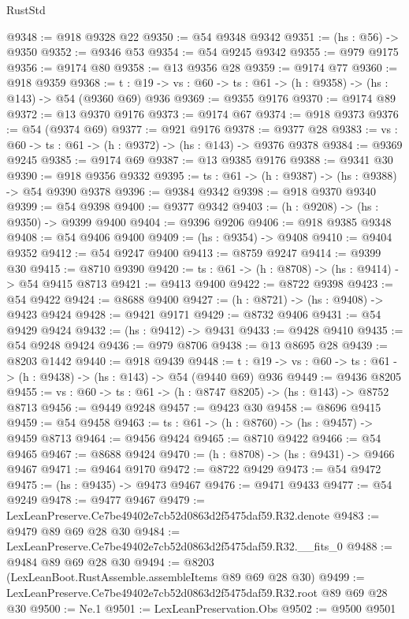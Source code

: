 \begin{lexlean}{RustStd}
\begin{coremodule}
@9348 := @918 @9328 @22
@9350 := @54 @9348 @9342
@9351 := (hs : @56) -> @9350
@9352 := @9346 @53
@9354 := @54 @9245 @9342
@9355 := @979 @9175
@9356 := @9174 @80
@9358 := @13 @9356 @28
@9359 := @9174 @77
@9360 := @918 @9359
@9368 := {t : @19} -> {vs : @60} -> {ts : @61} -> (h : @9358) -> (hs : @143) -> @54 (@9360 @69) @936
@9369 := @9355 @9176
@9370 := @9174 @89
@9372 := @13 @9370 @9176
@9373 := @9174 @67
@9374 := @918 @9373
@9376 := @54 (@9374 @69)
@9377 := @921 @9176
@9378 := @9377 @28
@9383 := {vs : @60} -> {ts : @61} -> (h : @9372) -> (hs : @143) -> @9376 @9378
@9384 := @9369 @9245
@9385 := @9174 @69
@9387 := @13 @9385 @9176
@9388 := @9341 @30
@9390 := @918 @9356 @9332
@9395 := {ts : @61} -> (h : @9387) -> (hs : @9388) -> @54 @9390 @9378
@9396 := @9384 @9342
@9398 := @918 @9370 @9340
@9399 := @54 @9398
@9400 := @9377 @9342
@9403 := (h : @9208) -> (hs : @9350) -> @9399 @9400
@9404 := @9396 @9206
@9406 := @918 @9385 @9348
@9408 := @54 @9406 @9400
@9409 := (hs : @9354) -> @9408
@9410 := @9404 @9352
@9412 := @54 @9247 @9400
@9413 := @8759 @9247
@9414 := @9399 @30
@9415 := @8710 @9390
@9420 := {ts : @61} -> (h : @8708) -> (hs : @9414) -> @54 @9415 @8713
@9421 := @9413 @9400
@9422 := @8722 @9398
@9423 := @54 @9422
@9424 := @8688 @9400
@9427 := (h : @8721) -> (hs : @9408) -> @9423 @9424
@9428 := @9421 @9171
@9429 := @8732 @9406
@9431 := @54 @9429 @9424
@9432 := (hs : @9412) -> @9431
@9433 := @9428 @9410
@9435 := @54 @9248 @9424
@9436 := @979 @8706
@9438 := @13 @8695 @28
@9439 := @8203 @1442
@9440 := @918 @9439
@9448 := {t : @19} -> {vs : @60} -> {ts : @61} -> (h : @9438) -> (hs : @143) -> @54 (@9440 @69) @936
@9449 := @9436 @8205
@9455 := {vs : @60} -> {ts : @61} -> (h : @8747 @8205) -> (hs : @143) -> @8752 @8713
@9456 := @9449 @9248
@9457 := @9423 @30
@9458 := @8696 @9415
@9459 := @54 @9458
@9463 := {ts : @61} -> (h : @8760) -> (hs : @9457) -> @9459 @8713
@9464 := @9456 @9424
@9465 := @8710 @9422
@9466 := @54 @9465
@9467 := @8688 @9424
@9470 := (h : @8708) -> (hs : @9431) -> @9466 @9467
@9471 := @9464 @9170
@9472 := @8722 @9429
@9473 := @54 @9472
@9475 := (hs : @9435) -> @9473 @9467
@9476 := @9471 @9433
@9477 := @54 @9249
@9478 := @9477 @9467
@9479 := LexLeanPreserve.Ce7be49402e7cb52d0863d2f5475daf59.R32.denote
@9483 := @9479 @89 @69 @28 @30
@9484 := LexLeanPreserve.Ce7be49402e7cb52d0863d2f5475daf59.R32.__fits_0
@9488 := @9484 @89 @69 @28 @30
@9494 := @8203 (LexLeanBoot.RustAssemble.assembleItems @89 @69 @28 @30)
@9499 := LexLeanPreserve.Ce7be49402e7cb52d0863d2f5475daf59.R32.root @89 @69 @28 @30
@9500 := Ne.{1}
@9501 := LexLeanPreservation.Obs
@9502 := @9500 @9501

\end{coremodule}
\end{lexlean}
